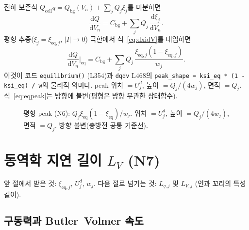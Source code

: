 \documentclass[11pt,a4paper]{article}
\newcommand{\dd}{\mathrm{d}}
\newcommand{\eq}{\mathrm{eq}}
\newcommand{\cell}{\mathrm{cell}}
\newcommand{\bg}{\mathrm{bg}}
\begin{document}
전하 보존식 $Q_\cell q = Q_\bg(V_n) + \sum_j Q_j\xi_j$를 미분하면
\begin{equation}
  \frac{\dd Q}{\dd V_n} = C_\bg + \sum_j Q_j\,\frac{\dd\xi_j}{\dd V_n}.
  \label{eq:dQdV}
\end{equation}
평형 추종($\xi_j = \xi_{\eq,j}$, $|I|\to0$) 극한에서 식~\eqref{eq:dxidV}를 대입하면
\begin{equation}
  \boxed{\frac{\dd Q}{\dd V_n}\bigg|_{\eq} = C_\bg + \sum_j Q_j\,
  \frac{\xi_{\eq,j}(1-\xi_{\eq,j})}{w_j}.}
  \label{eq:eqpeak}
\end{equation}
이것이 코드 \texttt{equilibrium()} (L354)과 \texttt{dqdv} L468의
\texttt{peak\_shape = ksi\_eq * (1 - ksi\_eq) / w}의 물리적 의미다.
peak 위치 $= U_j^d$, 높이 $= Q_j/(4w_j)$, 면적 $= Q_j$.
식~\eqref{eq:eqpeak}는 방향에 불변(평형은 방향 무관한 상태함수).

\begin{figure}[h]
\centering
{}
\caption{평형 peak (N6): $Q_j\xi_{\eq}(1-\xi_{\eq})/w_j$. 위치 $=U_j^d$,
높이 $=Q_j/(4w_j)$, 면적 $=Q_j$. 방향 불변(충방전 공통 기준선).}
\label{fig:eqpeak}
\end{figure}

\section{동역학 지연 길이 $L_V$ (N7)}
\label{sec:Lq}
앞 절에서 받은 것: $\xi_{\eq,j}$, $U_j^d$, $w_j$.
다음 절로 넘기는 것: $L_{q,j}$ 및 $L_{V,j}$ (인과 꼬리의 특성 길이).

\subsection{구동력과 Butler--Volmer 속도}
\end{document}
